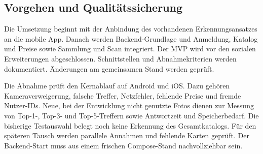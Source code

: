\subsection{Vorgehen und Qualitätssicherung}
Die Umsetzung beginnt mit der Anbindung des vorhandenen Erkennungsansatzes an die mobile App. Danach werden Backend-Grundlage und Anmeldung, Katalog und Preise sowie Sammlung und Scan integriert. Der MVP wird vor den sozialen Erweiterungen abgeschlossen. Schnittstellen und Abnahmekriterien werden dokumentiert. Änderungen am gemeinsamen Stand werden geprüft.

Die Abnahme prüft den Kernablauf auf Android und iOS. Dazu gehören Kameraverweigerung, falsche Treffer, Netzfehler, fehlende Preise und fremde Nutzer-IDs. Neue, bei der Entwicklung nicht genutzte Fotos dienen zur Messung von Top-1-, Top-3- und Top-5-Treffern sowie Antwortzeit und Speicherbedarf. Die bisherige Testauswahl belegt noch keine Erkennung des Gesamtkatalogs. Für den späteren Tausch werden parallele Annahmen und fehlende Karten geprüft. Der Backend-Start muss aus einem frischen Compose-Stand nachvollziehbar sein.

